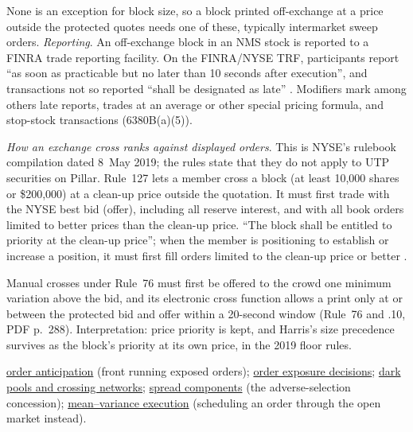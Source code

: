 \begin{qfdefinition}
None is an exception for block size, so a block printed off-exchange at a price outside the protected quotes needs one of these, typically intermarket sweep orders. \emph{Reporting}. An off-exchange block in an NMS stock is reported to a FINRA trade reporting facility. On the FINRA/NYSE TRF, participants report ``as soon as practicable but no later than 10 seconds after execution'', and transactions not so reported ``shall be designated as late'' \citep[Rule 6380B(a)(1) and (a)(4), version of 30 March to 5 December 2026]{finra-rules-2026}. Modifiers mark among others late reports, trades at an average or other special pricing formula, and stop-stock transactions (6380B(a)(5)).

\emph{How an exchange cross ranks against displayed orders}. This is NYSE's rulebook compilation dated 8~May 2019; the rules state that they do not apply to UTP securities on Pillar. Rule~127 lets a member cross a block (at least 10{,}000 shares or \$200{,}000) at a clean-up price outside the quotation. It must first trade with the NYSE best bid (offer), including all reserve interest, and with all book orders limited to better prices than the clean-up price. ``The block shall be entitled to priority at the clean-up price''; when the member is positioning to establish or increase a position, it must first fill orders limited to the clean-up price or better \citep[Rule~127(b)(ii), (c), Supplementary Material .10, PDF pp.~423--424]{nyse-rules-2019}.

Manual crosses under Rule~76 must first be offered to the crowd one minimum variation above the bid, and its electronic cross function allows a print only at or between the protected bid and offer within a 20-second window (Rule~76 and .10, PDF p.~288). Interpretation: price priority is kept, and Harris's size precedence survives as the block's priority at its own price, in the 2019 floor rules.

 \hyperref[def:order-anticipation]{order anticipation} (front running exposed orders); \hyperref[def:order-exposure-decisions]{order exposure decisions}; \hyperref[def:dark-pools-crossing]{dark pools and crossing networks}; \hyperref[res:adverse-selection-spread-component]{spread components} (the adverse-selection concession); \hyperref[mod:almgren-chriss-execution]{mean--variance execution} (scheduling an order through the open market instead).

\end{qfdefinition}
